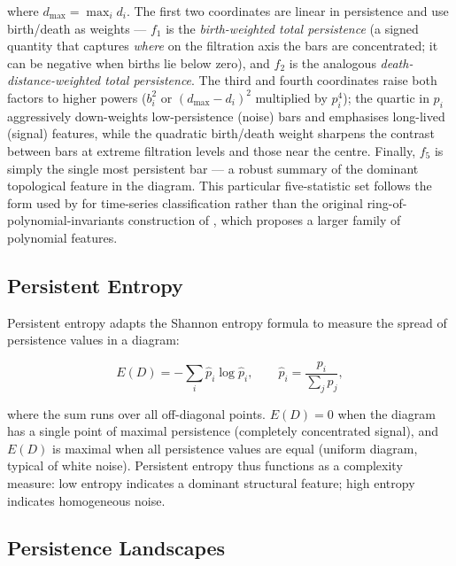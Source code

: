 \documentclass[12pt, a4paper]{article}
\theoremstyle{definition}
\theoremstyle{plain}
\begin{document}
where $d_{\max} = \max_i d_i$. The first two coordinates are linear in
persistence and use birth/death as weights — $f_1$ is the
\emph{birth-weighted total persistence} (a signed quantity that captures
\emph{where} on the filtration axis the bars are concentrated; it can be
negative when births lie below zero), and $f_2$ is the analogous
\emph{death-distance-weighted total persistence}. The third and fourth
coordinates raise both factors to higher powers ($b_i^2$ or $(d_{\max} - d_i)^2$
multiplied by $p_i^4$); the quartic in $p_i$ aggressively down-weights
low-persistence (noise) bars and emphasises long-lived (signal) features,
while the quadratic birth/death weight sharpens the contrast between bars at
extreme filtration levels and those near the centre. Finally, $f_5$ is simply
the single most persistent bar — a robust summary of the dominant topological
feature in the diagram. This particular five-statistic set follows the form
used by \citet{umeda2017time} for time-series classification rather than the
original ring-of-polynomial-invariants construction of \citet{adcock2016ring},
which proposes a larger family of polynomial features.

\subsection{Persistent Entropy}

Persistent entropy \citep{chintakunta2015entropy} adapts the Shannon entropy
formula to measure the spread of persistence values in a diagram:

\begin{equation}
  E(D) = -\sum_i \hat{p}_i \log \hat{p}_i,
  \qquad \hat{p}_i = \frac{p_i}{\sum_j p_j},
  \label{eq:pers_entropy}
\end{equation}

where the sum runs over all off-diagonal points. $E(D) = 0$ when the diagram
has a single point of maximal persistence (completely concentrated signal),
and $E(D)$ is maximal when all persistence values are equal (uniform diagram,
typical of white noise). Persistent entropy thus functions as a complexity
measure: low entropy indicates a dominant structural feature; high entropy
indicates homogeneous noise.

\subsection{Persistence Landscapes}
\end{document}
